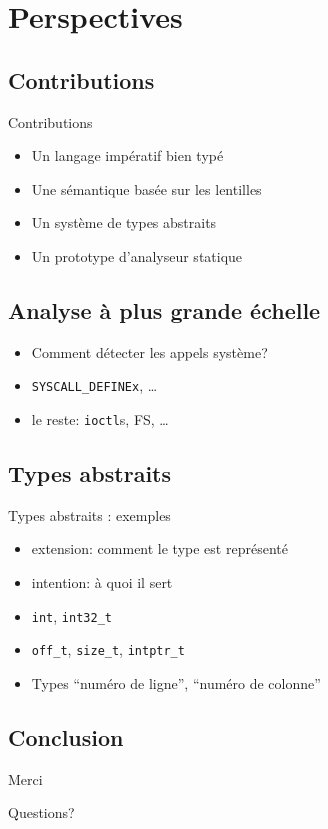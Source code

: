 \section{Perspectives}

\subsection{Contributions}

\begin{frame}{Contributions}
\begin{itemize}
\item Un langage impératif bien typé
\item Une sémantique basée sur les lentilles
\item Un système de types abstraits
\item Un prototype d'analyseur statique
\end{itemize}
\end{frame}

\subsection{Analyse à plus grande échelle}

\begin{frame}
    \begin{itemize}
        \item Comment détecter les appels système?
        \item \texttt{SYSCALL\_DEFINEx}, …
        \item le reste: \texttt{ioctl}s, FS, …
    \end{itemize}
\end{frame}


\subsection{Types abstraits}

\begin{frame}{Types abstraits : exemples}
    \begin{itemize}
        \item extension: comment le type est représenté
        \item intention: à quoi il sert
        \item \texttt{int}, \texttt{int32\_t}
        \item \texttt{off\_t}, \texttt{size\_t}, \texttt{intptr\_t}
        \item Types \enquote{numéro de ligne}, \enquote{numéro de colonne}
    \end{itemize}
\end{frame}

\subsection{Conclusion}


\begin{frame}
    Merci

    Questions?
\end{frame}
